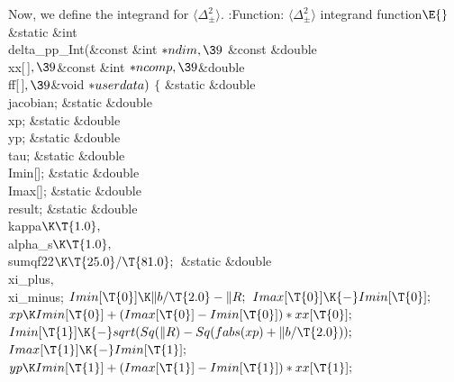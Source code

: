 \documentclass{cweb}
\begin{document}
Now, we define the integrand for $\langle \Delta_\pm^2 \rangle$.
\Y\B\4:Function: $\langle \Delta_\pm^2 \rangle$ integrand function\X${}%
\E{}$\6
\&{static} \&{int} \\{delta\_pp\_Int}(\&{const} \&{int} ${}{*}\\{ndim},\39{}$%
\&{const} \&{double} \\{xx}[\,]${},\39{}$\&{const} \&{int} ${}{*}\\{ncomp},%
\39{}$\&{double} \\{ff}[\,]${},\39{}$\&{void} ${}{*}\\{userdata}){}$\1\1\2\2\6
${}\{{}$\1\6
\&{static} \&{double} \\{jacobian};\6
\&{static} \&{double} \\{xp};\6
\&{static} \&{double} \\{yp};\6
\&{static} \&{double} \\{tau};\6
\&{static} \&{double} \\{Imin}[];\6
\&{static} \&{double} \\{Imax}[];\6
\&{static} \&{double} \\{result};\6
\&{static} \&{double} \\{kappa}${}\K\T{1.0},{}$ \\{alpha\_s}${}\K\T{1.0},{}$ %
\\{sumqf22}${}\K\T{25.0}/\T{81.0};{}$\6
\&{static} \&{double} \\{xi\_plus}${},{}$ \\{xi\_minus};\7
${}\\{Imin}[\T{0}]\K\|b/\T{2.0}-\|R;{}$\6
${}\\{Imax}[\T{0}]\K{-}\\{Imin}[\T{0}];{}$\6
${}\\{xp}\K\\{Imin}[\T{0}]+(\\{Imax}[\T{0}]-\\{Imin}[\T{0}])*\\{xx}[\T{0}];{}$\6
${}\\{Imin}[\T{1}]\K{-}\\{sqrt}(\\{Sq}(\|R)-\\{Sq}(\\{fabs}(\\{xp})+\|b/%
\T{2.0}));{}$\6
${}\\{Imax}[\T{1}]\K{-}\\{Imin}[\T{1}];{}$\6
${}\\{yp}\K\\{Imin}[\T{1}]+(\\{Imax}[\T{1}]-\\{Imin}[\T{1}])*\\{xx}[\T{1}];{}$\6
\end{document}
